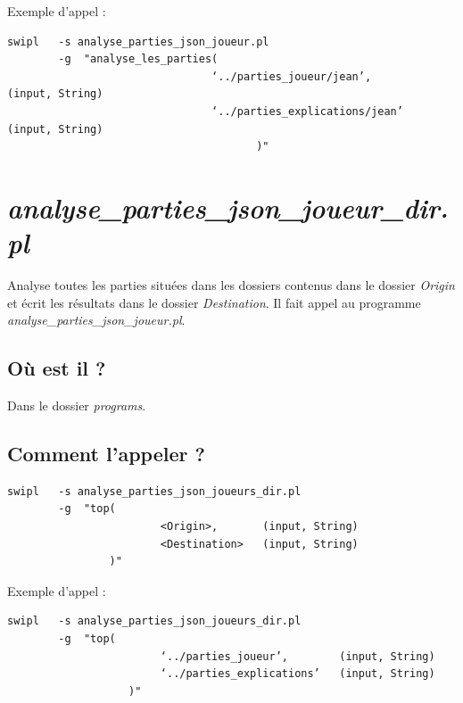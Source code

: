 \documentclass[a4paper,12pt]{article}
\begin{document}
Exemple d’appel :
\begin{Verbatim}
swipl	-s analyse_parties_json_joueur.pl
		-g  "analyse_les_parties(
								‘../parties_joueur/jean’, 			(input, String)
								‘../parties_explications/jean’	(input, String)
							     	   )"
\end{Verbatim}


\section{\emph{analyse\_parties\_json\_joueur\_dir.pl}}


Analyse toutes les parties situées dans les dossiers contenus dans le dossier \emph{Origin}
et écrit les résultats dans le dossier \emph{Destination}. Il fait appel au programme
\emph{analyse\_parties\_json\_joueur.pl}.

\subsection*{Où est il ?}
	Dans le dossier \emph{programs}.
	
\subsection*{Comment l’appeler ?}
	

\begin{Verbatim}
swipl	-s analyse_parties_json_joueurs_dir.pl
		-g  "top(
			  			<Origin>, 		(input, String)
			 			<Destination>	(input, String)
		   		)"
\end{Verbatim}

Exemple d’appel :
\begin{Verbatim}
swipl	-s analyse_parties_json_joueurs_dir.pl
		-g  "top(
						‘../parties_joueur’, 		(input, String)
						‘../parties_explications’	(input, String)
				   )"
\end{Verbatim}
\end{document}
